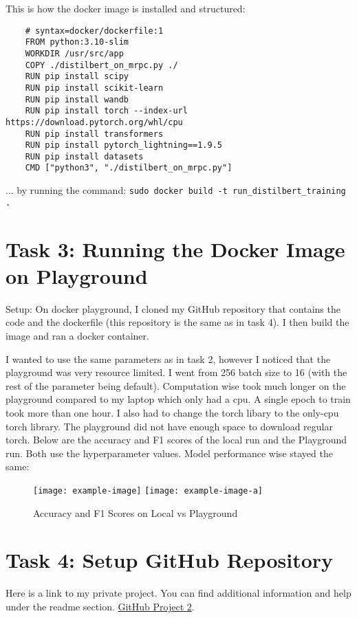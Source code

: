 \documentclass{article}
\begin{document}
This is how the docker image is installed and structured:

\begin{lstlisting}
    # syntax=docker/dockerfile:1
    FROM python:3.10-slim
    WORKDIR /usr/src/app
    COPY ./distilbert_on_mrpc.py ./ 
    RUN pip install scipy
    RUN pip install scikit-learn
    RUN pip install wandb
    RUN pip install torch --index-url https://download.pytorch.org/whl/cpu
    RUN pip install transformers 
    RUN pip install pytorch_lightning==1.9.5 
    RUN pip install datasets
    CMD ["python3", "./distilbert_on_mrpc.py"]
    \end{lstlisting}
... by running the command: 
\verb!sudo docker build -t run_distilbert_training .!

\section{Task 3: Running the Docker Image on Playground}
Setup: On docker playground, I cloned my GitHub repository that contains the code and the dockerfile (this repository is the same as in task 4). 
I then build the image and ran a docker container. 

I wanted to use the same parameters as in task 2, 
however I noticed that the playground was very resource limited. I went from 256 batch size to 16 (with the rest of the parameter being default).
Computation wise took much longer on the playground compared to my laptop which only had a cpu. A single epoch to train took more than one hour. 
I also had to change the torch libary to the only-cpu torch library. The playground did not have enough space to download regular torch. 
Below are the accuracy and F1 scores of the local run and the Playground run. Both use the hyperparameter values. Model performance wise stayed the same:


\begin{figure*}[h]
    \centering
        \texttt{[image: example-image]}\hfil
        \texttt{[image: example-image-a]}\par\medskip
    \caption{Accuracy and F1 Scores on Local vs Playground}
    \end{figure*}



\section{Task 4: Setup GitHub Repository}
Here is a link to my private project. You can find additional information and help under the readme section.
\href{https://github.com/JDCarona/project2-mlops}{GitHub Project 2}.
\end{document}
